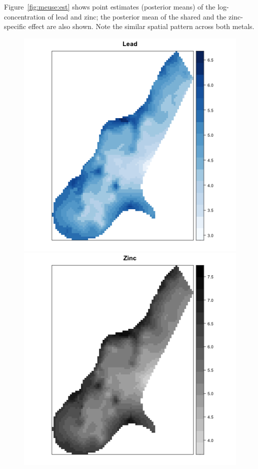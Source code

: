 Figure~\ref{fig:meuse:est} shows point estimates (posterior means) of the log-concentration of lead and zinc; the posterior mean of the shared and the zinc-specific effect are also shown. Note the similar spatial pattern across both metals.



\begin{figure}[h!]
\begin{center}
\includegraphics[scale=0.35]{images/Meuse_lead_estimate.png}
\includegraphics[scale=0.35]{images/Meuse_zinc_estimate.png}

\end{center}
\end{figure}
